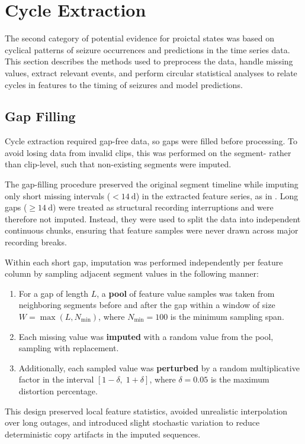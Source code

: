 \section{Cycle Extraction} \label{sec:cycle-extraction}

The second category of potential evidence for proictal states was based on cyclical patterns of seizure occurrences and predictions in the time series data.
This section describes the methods used to preprocess the data, handle missing values, extract relevant events, and perform circular statistical analyses to relate cycles in features to the timing of seizures and model predictions.

\subsection{Gap Filling} \label{subsec:gap-filling}
Cycle extraction required gap-free data, so gaps were filled before processing.
To avoid losing data from invalid clips, this was performed on the segment- rather than clip-level, such that non-existing segments were imputed.

The gap-filling procedure preserved the original segment timeline while imputing only short missing intervals ($<\SI{14}{\day}$) in the extracted feature series, as in \textcite{yang_seizure_2024}.
Long gaps ($\geq\SI{14}{\day}$) were treated as structural recording interruptions and were therefore not imputed.
Instead, they were used to split the data into independent continuous chunks, ensuring that feature samples were never drawn across major recording breaks.

Within each short gap, imputation was performed independently per feature column by sampling adjacent segment values in the following manner:
\begin{enumerate}
    \item For a gap of length $L$, a \textbf{pool} of feature value samples was taken from neighboring segments before and after the gap within a window of size $W=\max(L, N_{\min})$, where $N_{\min}=100$ is the minimum sampling span.
    \item Each missing value was \textbf{imputed} with a random value from the pool, sampling with replacement.
    \item Additionally, each sampled value was \textbf{perturbed} by a random multiplicative factor in the interval $[1-\delta,\;1+\delta]$, where $\delta=0.05$ is the maximum distortion percentage. 
\end{enumerate}
This design preserved local feature statistics, avoided unrealistic interpolation over long outages, and introduced slight stochastic variation to reduce deterministic copy artifacts in the imputed sequences.


